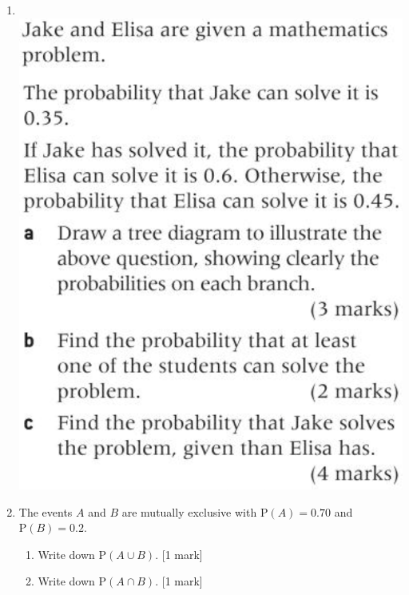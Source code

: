 \documentclass[12pt, twoside]{article}
\begin{document}
\begin{enumerate}
\newpage
\item \; \\
    \includegraphics[scale=0.5]{../graphics/1-23Problem12-p374.png} \vspace{8cm}

\item The events $A$ and $B$ are mutually exclusive with $\mathrm P(A)=0.70$ and $\mathrm P(B)=0.2$.
    \begin{enumerate}[itemsep=1.5cm]
        \item Write down $\mathrm P(A \cup B)$. \hfill [1 mark]
        \item Write down $\mathrm P(A \cap B)$. \hfill [1 mark]
    \end{enumerate}


\end{enumerate}
\end{document}
